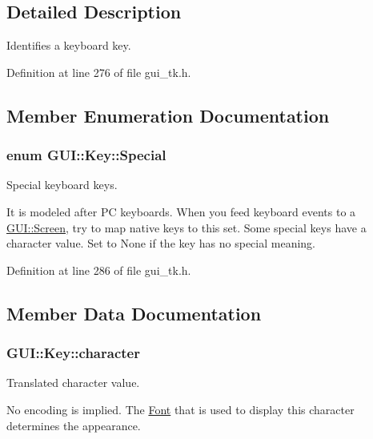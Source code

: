 \subsection{Detailed Description}
Identifies a keyboard key. 

Definition at line 276 of file gui\-\_\-tk.\-h.



\subsection{Member Enumeration Documentation}
\hypertarget{classGUI_1_1Key_a9d3f8dbfc08f0189dbb8aa5a20b9ea99}{
\subsubsection[{Special}]{\setlength{\rightskip}{0pt plus 5cm}enum {\bf G\-U\-I\-::\-Key\-::\-Special}}}\label{classGUI_1_1Key_a9d3f8dbfc08f0189dbb8aa5a20b9ea99}


Special keyboard keys. 

It is modeled after P\-C keyboards. When you feed keyboard events to a \hyperlink{classGUI_1_1Screen}{G\-U\-I\-::\-Screen}, try to map native keys to this set. Some special keys have a character value. Set to {\ttfamily None} if the key has no special meaning. 

Definition at line 286 of file gui\-\_\-tk.\-h.



\subsection{Member Data Documentation}
\hypertarget{classGUI_1_1Key_a08e3432cc2bc3ceded36c3405fca4353}{
\subsubsection[{character}]{ {\bf G\-U\-I\-::\-Key\-::character}}}\label{classGUI_1_1Key_a08e3432cc2bc3ceded36c3405fca4353}


Translated character value. 

No encoding is implied. The \hyperlink{classGUI_1_1Font}{Font} that is used to display this character determines the appearance. 

